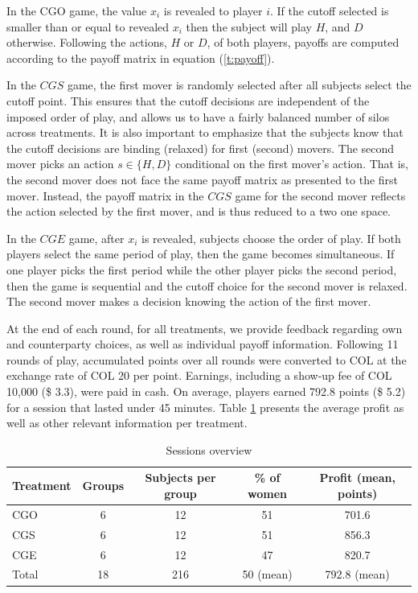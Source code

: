 \documentclass[11pt, letterpaper]{article}
\theoremstyle{plain}
\begin{document}
In the CGO game, the value $x_i$ is revealed to player $i$. If the cutoff selected is smaller than or equal to revealed $x_i$ then the subject will play $H$, and $D$ otherwise. Following the actions, $H$ or $D$, of both players, payoffs are computed according to the payoff matrix in equation (\ref{t:payoff}). 

In the $CGS$ game, the first mover is randomly selected after all subjects select the cutoff point. This ensures that the cutoff decisions are independent of the imposed order of play, and allows us to have a fairly balanced number of silos across treatments. It is also important to emphasize that the subjects know that the cutoff decisions are binding (relaxed) for first (second) movers. The second mover picks an action $s\in\{H,D\}$ conditional on the first mover's action. That is, the second mover does not face the same payoff matrix as presented to the first mover. Instead, the payoff matrix in the $CGS$ game for the second mover reflects the action selected by the first mover, and is thus reduced to a two \times one space. 

In the $CGE$ game, after $x_i$ is revealed, subjects choose the order of play. If both players select the same period of play, then the game becomes simultaneous. If one player picks the first period while the other player picks the second period, then the game is sequential and the cutoff choice for the second mover is relaxed. The second mover makes a decision knowing the action of the first mover. 

At the end of each round, for all treatments, we provide feedback regarding own and counterparty choices, as well as individual payoff information. Following 11 rounds of play, accumulated points over all rounds were converted to COL at the exchange rate of COL 20 per point. Earnings, including a show-up fee of COL 10,000 (\$ 3.3), were paid in cash. On average, players earned 792.8 points (\$ 5.2) for a session that lasted under 45 minutes. Table \ref{session} presents the average profit as well as other relevant information per treatment. 

\begin{table}[ht]
\centering
\caption{Sessions overview }
\hline
\begin{tabular}{lcccc}
  Treatment & Groups & Subjects per group & \% of women & Profit (mean, points)\\
  \hline  
  CGO & 6 & 12 & 51 & 701.6 \\
  CGS & 6 & 12 & 51 & 856.3 \\
  CGE & 6 & 12 & 47 & 820.7 \\
\hline
Total & 18 & 216 &  50 (mean) & 792.8 (mean)\\
\end{tabular}

\label{session}
\end{table}
\end{document}
